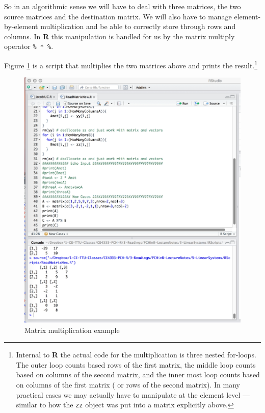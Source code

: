 So in an algorithmic sense we will have to deal with three matrices, the two source matrices and the destination matrix.  
We will also have to manage element-by-element multiplication and be able to correctly store through rows and columns.
In \textbf{R} this manipulation is handled for us by the matrix multiply operator \texttt{\% * \%}. 

Figure \ref{fig:MultiplyMatrix} is a script that multiplies the two matrices above and prints the result.\footnote{Internal to \textbf{R} the actual code for the multiplication is three nested for-loops.  The outer loop counts based rows of the first matrix, the middle loop counts based on columns of the second matrix, and the inner most loop counts based on columns of the first matrix ( or rows of the second matrix).   In many practical cases we may actually have to manipulate at the element level --- similar to how the \texttt{zz} object was put into a matrix explicitly above.}   

\begin{figure}[h!] %
   \centering
   \includegraphics[width=6in]{./5-LinearSystems/MultiplyMatrix.jpg} 
   \caption{Matrix multiplication example}
   \label{fig:MultiplyMatrix}
\end{figure}

